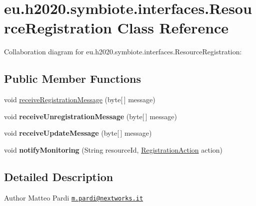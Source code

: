 \hypertarget{classeu_1_1h2020_1_1symbiote_1_1interfaces_1_1ResourceRegistration}{}\section{eu.\+h2020.\+symbiote.\+interfaces.\+Resource\+Registration Class Reference}
\label{classeu_1_1h2020_1_1symbiote_1_1interfaces_1_1ResourceRegistration}


Collaboration diagram for eu.\+h2020.\+symbiote.\+interfaces.\+Resource\+Registration\+:
\subsection*{Public Member Functions}
\begin{DoxyCompactItemize}
\item 
void \hyperlink{classeu_1_1h2020_1_1symbiote_1_1interfaces_1_1ResourceRegistration_a21a71733e6ea0378c24b4fbda6ba8dfa}{receive\+Registration\+Message} (byte\mbox{[}$\,$\mbox{]} message)
\item 
\mbox{\label{classeu_1_1h2020_1_1symbiote_1_1interfaces_1_1ResourceRegistration_ad7f95fecc503f944279d946fc1d8a3a7}} 
void {\bfseries receive\+Unregistration\+Message} (byte\mbox{[}$\,$\mbox{]} message)
\item 
\mbox{\label{classeu_1_1h2020_1_1symbiote_1_1interfaces_1_1ResourceRegistration_ac82d50a0f49887130f000c5d4a4edcbb}} 
void {\bfseries receive\+Update\+Message} (byte\mbox{[}$\,$\mbox{]} message)
\item 
\mbox{\label{classeu_1_1h2020_1_1symbiote_1_1interfaces_1_1ResourceRegistration_ae3ef901d0192ae12d36ce5858bd29821}} 
void {\bfseries notify\+Monitoring} (String resource\+Id, \hyperlink{enumeu_1_1h2020_1_1symbiote_1_1messages_1_1RegistrationMessage_1_1RegistrationAction}{Registration\+Action} action)
\end{DoxyCompactItemize}


\subsection{Detailed Description}
\begin{DoxyAuthor}{Author}
Matteo Pardi \href{mailto:m.pardi@nextworks.it}{\tt m.\+pardi@nextworks.\+it} 
\end{DoxyAuthor}


